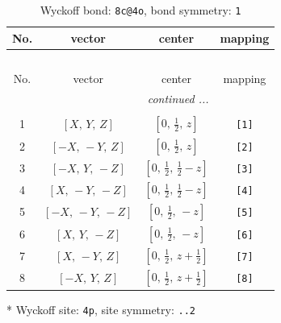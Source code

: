 \documentclass[fleqn,8pt]{jsarticle}
\begin{document}
\renewcommand{\arraystretch}{1.2}
\begin{longtable}{cccc}
\caption{Wyckoff bond: {\tt 8c@4o}, bond symmetry: {\tt 1}}
 \\
 \hline \hline
No. & vector & center & mapping \\ \hline \endfirsthead

\multicolumn{3}{l}{\tablename\ \thetable{}} \\
 \hline \hline
No. & vector & center & mapping \\ \hline \endhead

 \hline \hline
\multicolumn{3}{r}{\footnotesize\it continued ...} \\ \endfoot

 \hline \hline
\multicolumn{3}{r}{} \\ \endlastfoot

1 & $\left[ X,\, Y,\, Z \right]$ & $\left[ 0,\, \frac{1}{2},\, z \right]$ & {\tt [1]} \\ \hline
2 & $\left[ - X,\, - Y,\, Z \right]$ & $\left[ 0,\, \frac{1}{2},\, z \right]$ & {\tt [2]} \\ \hline
3 & $\left[ - X,\, Y,\, - Z \right]$ & $\left[ 0,\, \frac{1}{2},\, \frac{1}{2} - z \right]$ & {\tt [3]} \\ \hline
4 & $\left[ X,\, - Y,\, - Z \right]$ & $\left[ 0,\, \frac{1}{2},\, \frac{1}{2} - z \right]$ & {\tt [4]} \\ \hline
5 & $\left[ - X,\, - Y,\, - Z \right]$ & $\left[ 0,\, \frac{1}{2},\, - z \right]$ & {\tt [5]} \\ \hline
6 & $\left[ X,\, Y,\, - Z \right]$ & $\left[ 0,\, \frac{1}{2},\, - z \right]$ & {\tt [6]} \\ \hline
7 & $\left[ X,\, - Y,\, Z \right]$ & $\left[ 0,\, \frac{1}{2},\, z + \frac{1}{2} \right]$ & {\tt [7]} \\ \hline
8 & $\left[ - X,\, Y,\, Z \right]$ & $\left[ 0,\, \frac{1}{2},\, z + \frac{1}{2} \right]$ & {\tt [8]} \\
\end{longtable}
* Wyckoff site: {\tt 4p}, site symmetry: {\tt ..2}
\renewcommand{\arraystretch}{1.2}
\end{document}
